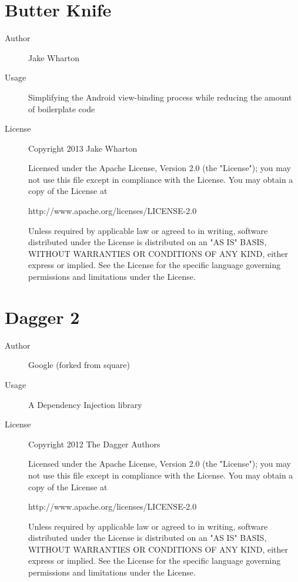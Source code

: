 \section*{Butter Knife}
\begin{description}
    \item[Author] Jake Wharton
    \item[Usage] Simplifying the Android view-binding process while reducing the amount of boilerplate code 
    \item[License] \scriptsize Copyright 2013 Jake Wharton
    
    Licensed under the Apache License, Version 2.0 (the "License");
you may not use this file except in compliance with the License.
You may obtain a copy of the License at

   http://www.apache.org/licenses/LICENSE-2.0

Unless required by applicable law or agreed to in writing, software
distributed under the License is distributed on an "AS IS" BASIS,
WITHOUT WARRANTIES OR CONDITIONS OF ANY KIND, either express or implied.
See the License for the specific language governing permissions and
limitations under the License.
    
\end{description}


\section*{Dagger 2}
\begin{description}
    \item[Author] Google (forked from square)
    \item[Usage] A Dependency Injection library
    \item[License] \scriptsize Copyright 2012 The Dagger Authors
    
Licensed under the Apache License, Version 2.0 (the "License");
you may not use this file except in compliance with the License.
You may obtain a copy of the License at

   http://www.apache.org/licenses/LICENSE-2.0

Unless required by applicable law or agreed to in writing, software
distributed under the License is distributed on an "AS IS" BASIS,
WITHOUT WARRANTIES OR CONDITIONS OF ANY KIND, either express or implied.
See the License for the specific language governing permissions and
limitations under the License.
    
\end{description}    

